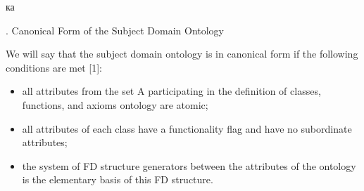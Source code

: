 ка\documentclass[times]{article}
\newcommand{\RomanNumeralCaps}[1]
    {\MakeUppercase{\romannumeral #1}}
\begin{document}
\begin{center}
    \RomanNumeralCaps{4}. Canonical Form of the Subject Domain Ontology 
\end{center}

We will say that the subject domain ontology is in canonical form if the following conditions are met [1]:

\begin{itemize}
    \setlength{\itemsep}{1pt}
    \setlength{\parskip}{0pt}
    \item all attributes from the set A participating in the definition of classes, functions, and axioms ontology are atomic;
    \item all attributes of each class have a functionality flag and have no subordinate attributes;
    \item the system of FD structure generators between the attributes of the ontology is the elementary basis of this FD structure.
\end{itemize}
\end{document}
